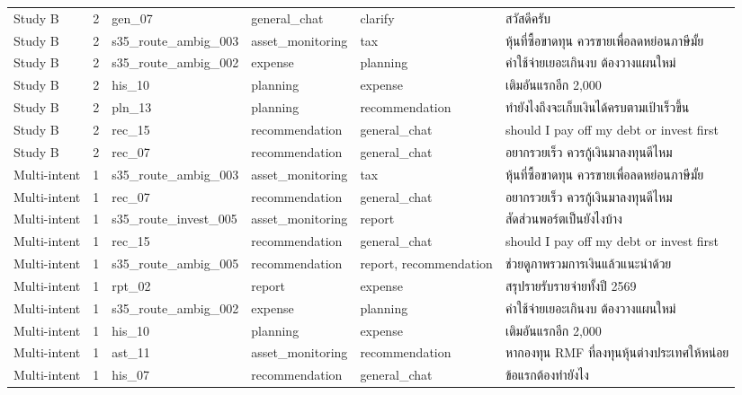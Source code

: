 \documentclass[11pt,a4paper]{article}
\begin{document}
{\begin{longtable}{llp{2.5cm}p{2.1cm}p{2.5cm}p{5.4cm}}
Study B & 2 & gen\_\allowbreak{}07 & general\_\allowbreak{}chat & clarify & {\thaifont สวัสดีครับ} \\
Study B & 2 & s35\_\allowbreak{}route\_\allowbreak{}ambig\_\allowbreak{}003 & asset\_\allowbreak{}monitoring & tax & {\thaifont หุ้นที่ซื้อขาดทุน ควรขายเพื่อลดหย่อนภาษีมั้ย} \\
Study B & 2 & s35\_\allowbreak{}route\_\allowbreak{}ambig\_\allowbreak{}002 & expense & planning & {\thaifont ค่าใช้จ่ายเยอะเกินงบ ต้องวางแผนใหม่} \\
Study B & 2 & his\_\allowbreak{}10 & planning & expense & {\thaifont เติมอันแรกอีก }2,000 \\
Study B & 2 & pln\_\allowbreak{}13 & planning & recommendation & {\thaifont ทำยังไงถึงจะเก็บเงินได้ครบตามเป้าเร็วขึ้น} \\
Study B & 2 & rec\_\allowbreak{}15 & recommendation & general\_\allowbreak{}chat & should I pay off my debt or invest first \\
Study B & 2 & rec\_\allowbreak{}07 & recommendation & general\_\allowbreak{}chat & {\thaifont อยากรวยเร็ว ควรกู้เงินมาลงทุนดีไหม} \\
Multi-intent & 1 & s35\_\allowbreak{}route\_\allowbreak{}ambig\_\allowbreak{}003 & asset\_\allowbreak{}monitoring & tax & {\thaifont หุ้นที่ซื้อขาดทุน ควรขายเพื่อลดหย่อนภาษีมั้ย} \\
Multi-intent & 1 & rec\_\allowbreak{}07 & recommendation & general\_\allowbreak{}chat & {\thaifont อยากรวยเร็ว ควรกู้เงินมาลงทุนดีไหม} \\
Multi-intent & 1 & s35\_\allowbreak{}route\_\allowbreak{}invest\_\allowbreak{}005 & asset\_\allowbreak{}monitoring & report & {\thaifont สัดส่วนพอร์ตเป็นยังไงบ้าง} \\
Multi-intent & 1 & rec\_\allowbreak{}15 & recommendation & general\_\allowbreak{}chat & should I pay off my debt or invest first \\
Multi-intent & 1 & s35\_\allowbreak{}route\_\allowbreak{}ambig\_\allowbreak{}005 & recommendation & report, recommendation & {\thaifont ช่วยดูภาพรวมการเงินแล้วแนะนำด้วย} \\
Multi-intent & 1 & rpt\_\allowbreak{}02 & report & expense & {\thaifont สรุปรายรับรายจ่ายทั้งปี }2569 \\
Multi-intent & 1 & s35\_\allowbreak{}route\_\allowbreak{}ambig\_\allowbreak{}002 & expense & planning & {\thaifont ค่าใช้จ่ายเยอะเกินงบ ต้องวางแผนใหม่} \\
Multi-intent & 1 & his\_\allowbreak{}10 & planning & expense & {\thaifont เติมอันแรกอีก }2,000 \\
Multi-intent & 1 & ast\_\allowbreak{}11 & asset\_\allowbreak{}monitoring & recommendation & {\thaifont หากองทุน }RMF {\thaifont ที่ลงทุนหุ้นต่างประเทศให้หน่อย} \\
Multi-intent & 1 & his\_\allowbreak{}07 & recommendation & general\_\allowbreak{}chat & {\thaifont ข้อแรกต้องทำยังไง} \\
\end{longtable}}
\end{document}
